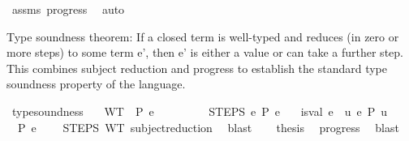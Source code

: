 \begin{isabellebody}
%
\isadelimproof
%
\endisadelimproof
%
\isatagproof
{}\isamarkupfalse%
\ assms\ progress\ \isamarkupfalse%
\ auto%
\endisatagproof
{\isafoldproof}%
%
\isadelimproof
%
\endisadelimproof
%
\isadelimdocument
%
\endisadelimdocument
%
\isatagdocument
%
\isamarkuptrue%
%
\endisatagdocument
{\isafolddocument}%
%
\isadelimdocument
%
\endisadelimdocument
%
\begin{isamarkuptext}%
Type soundness theorem:
  If a closed term is well-typed and reduces (in zero or more steps)
  to some term e', then e' is either a value or can take a further step.
  This combines subject reduction and progress to establish
  the standard type soundness property of the language.%
\end{isamarkuptext}\isamarkuptrue%
\isamarkupfalse%
\ type{\isacharunderscore}{\kern0pt}soundness{\isacharcolon}{\kern0pt}\isanewline
\ \ \ WT{\isacharcolon}{\kern0pt}\ {\isachardoublequoteopen}{\isacharbrackleft}{\kern0pt}{\isacharbrackright}{\kern0pt}\ {\isasymturnstile}{\isacharbraceleft}{\kern0pt}P{\isacharbraceright}{\kern0pt}\ e\ {\isacharcolon}{\kern0pt}\ {\isasymtau}{\isachardoublequoteclose}\isanewline
\ \ \ \ \ \ \ STEPS{\isacharcolon}{\kern0pt}\ {\isachardoublequoteopen}e\ {\isacharminus}{\kern0pt}{\isachargreater}{\kern0pt}{\isacharbraceleft}{\kern0pt}P{\isacharbraceright}{\kern0pt}{\isacharasterisk}{\kern0pt}\ e{\isacharprime}{\kern0pt}{\isachardoublequoteclose}\isanewline
\ \ \ {\isachardoublequoteopen}is{\isacharunderscore}{\kern0pt}val\ e{\isacharprime}{\kern0pt}\ {\isasymor}\ {\isacharparenleft}{\kern0pt}{\isasymexists}u{\isachardot}{\kern0pt}\ e{\isacharprime}{\kern0pt}\ {\isacharminus}{\kern0pt}{\isachargreater}{\kern0pt}{\isacharbraceleft}{\kern0pt}P{\isacharbraceright}{\kern0pt}\ u{\isacharparenright}{\kern0pt}{\isachardoublequoteclose}\isanewline
%
\isadelimproof
%
\endisadelimproof
%
\isatagproof
{}\isamarkupfalse%
\ {\isacharminus}{\kern0pt}\isanewline
\ \ \isamarkupfalse%
\ {\isachardoublequoteopen}{\isacharbrackleft}{\kern0pt}{\isacharbrackright}{\kern0pt}\ {\isasymturnstile}{\isacharbraceleft}{\kern0pt}P{\isacharbraceright}{\kern0pt}\ e{\isacharprime}{\kern0pt}\ {\isacharcolon}{\kern0pt}\ {\isasymtau}{\isachardoublequoteclose}\ \isamarkupfalse%
\ STEPS\ WT\ subject{\isacharunderscore}{\kern0pt}reduction{\isacharprime}{\kern0pt}\ \isamarkupfalse%
\ blast\isanewline
\ \ \isamarkupfalse%
\ {\isacharquery}{\kern0pt}thesis\ \isamarkupfalse%
\ progress{\isacharprime}{\kern0pt}\ \isamarkupfalse%
\ blast\isanewline
{}\isamarkupfalse%
%
\endisatagproof
{\isafoldproof}%
%
\isadelimproof
\isanewline
%
\endisadelimproof
\isanewline
%
\isadelimtheory
\isanewline
%
\endisadelimtheory
%
\isatagtheory
{}\isamarkupfalse%
%
\endisatagtheory
{\isafoldtheory}%
%
\isadelimtheory
%
\endisadelimtheory
%
\end{isabellebody}%

